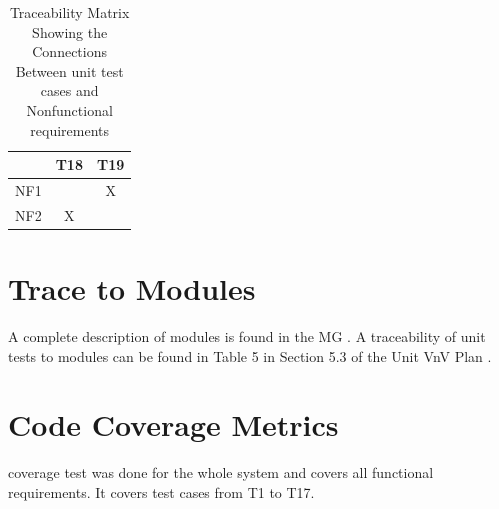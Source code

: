 \documentclass[12pt, titlepage]{article}
\begin{document}
\begin{table}[h!]
\centering
\begin{tabular}{|c|c|c|}
\hline
  & T18 & T19   \\
\hline
NF1  & & X \\ \hline
NF2  & X& \\ \hline
\hline
\end{tabular}
\caption{Traceability Matrix Showing the Connections Between unit test cases and Nonfunctional requirements}
\label{Table:R_trace1}
\end{table}

\section{Trace to Modules}

A complete description of modules is found in the MG \cite{Designdocument} . A
traceability of unit tests to modules can be found in Table 5 in Section 5.3
of the Unit VnV Plan \cite{UnitVnVPlan}.		

\section{Code Coverage Metrics}
coverage test was done for the whole system and covers all functional requirements. It covers test cases from T1 to T17. 
\newpage



\end{document}
